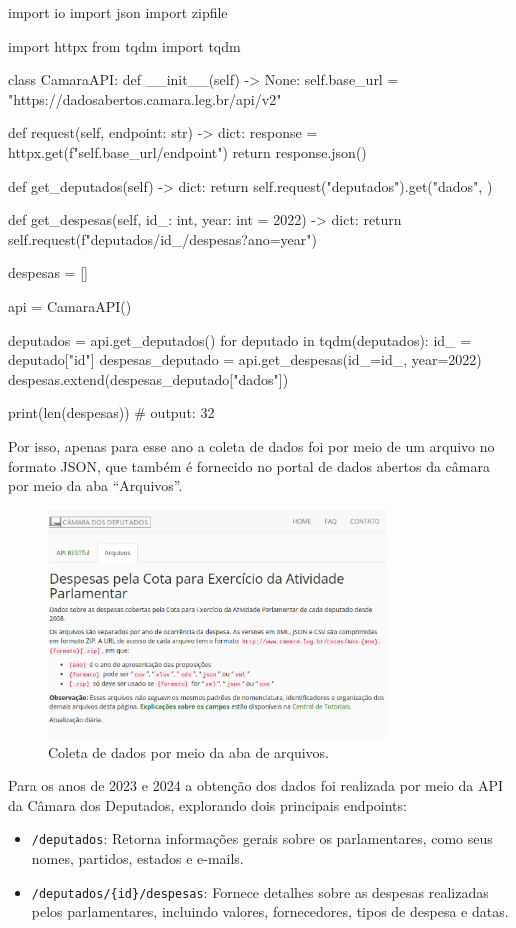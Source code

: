 \documentclass[12pt, a4paper]{article}
\begin{document}
\begin{python}
import io
import json
import zipfile

import httpx
from tqdm import tqdm

class CamaraAPI:
	def __init__(self) -> None:
		self.base_url = "https://dadosabertos.camara.leg.br/api/v2"
	
	def request(self, endpoint: str) -> dict:
		response = httpx.get(f"{self.base_url}/{endpoint}")
		return response.json()
	
	def get_deputados(self) -> dict:
		return self.request("deputados").get("dados", {})
	
	def get_despesas(self, id_: int, year: int = 2022) -> dict:
		return self.request(f"deputados/{id_}/despesas?ano={year}")

despesas = []

api = CamaraAPI()

deputados = api.get_deputados()
for deputado in tqdm(deputados):
	id_ = deputado["id"]
	despesas_deputado = api.get_despesas(id_=id_, year=2022)
	despesas.extend(despesas_deputado["dados"])

print(len(despesas))  # output: 32
\end{python}

Por isso, apenas para esse ano a coleta de dados foi por meio de um arquivo no formato JSON, que também é fornecido no portal de dados abertos da câmara por meio da aba “Arquivos”.

\begin{figure}[!htbp]
    \centering
    \includegraphics[width=0.8\textwidth]{assets/1_arquivos.png}
    \caption{Coleta de dados por meio da aba de arquivos.}
    \label{fig:arquivo_json}
\end{figure}

Para os anos de 2023 e 2024 a obtenção dos dados foi realizada por meio da API\cite{dados_abertos} da Câmara dos Deputados, explorando dois principais endpoints:
\begin{itemize}
    \item \texttt{/deputados}: Retorna informações gerais sobre os parlamentares, como seus nomes, partidos, estados e e-mails.
    \item \texttt{/deputados/\{id\}/despesas}: Fornece detalhes sobre as despesas realizadas pelos parlamentares, incluindo valores, fornecedores, tipos de despesa e datas.
\end{itemize}
\end{document}
